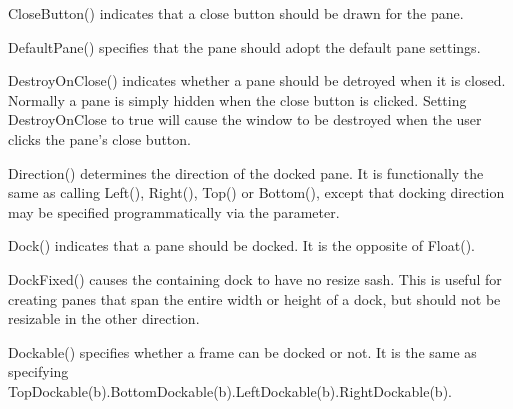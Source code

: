 
CloseButton() indicates that a close button should be drawn for the pane.

\label{wxauipaneinfodefaultpane}


DefaultPane() specifies that the pane should adopt the default pane settings.

\label{wxauipaneinfodestroyonclose}


DestroyOnClose() indicates whether a pane should be detroyed when it is closed. Normally a pane is simply hidden when the close button is clicked. Setting DestroyOnClose to true will cause the window to be destroyed when the user clicks the pane's close button.

\label{wxauipaneinfodirection}


Direction() determines the direction of the docked pane. It is functionally the same as calling Left(), Right(), Top() or Bottom(), except that docking direction may be specified programmatically via the parameter.

\label{wxauipaneinfodock}


Dock() indicates that a pane should be docked.  It is the opposite of Float().

\label{wxauipaneinfodockfixed}


DockFixed() causes the containing dock to have no resize sash.  This is useful for creating panes that span the entire width or height of a dock, but should not be resizable in the other direction.

\label{wxauipaneinfodockable}


Dockable() specifies whether a frame can be docked or not. It is the same as specifying TopDockable(b).BottomDockable(b).LeftDockable(b).RightDockable(b).

